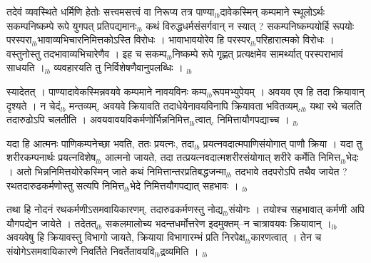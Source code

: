 \documentclass[article,12pt,a4paper]{memoir}%
\newcounter{parCount}
\begin{document}
	  \pstart \leavevmode%
	तदेवं व्यवस्थिते धर्मिणि हेतोः सत्त्वमसत्त्वं वा निरूप्य तत्र पाण्या{\tiny $_{lb}$}दावेकस्मिन् कम्पमाने स्थूलोऽर्थः सकम्पनिष्कम्पे रूपे युगपत् प्रतिपद्यमानः{\tiny $_{lb}$} कथं विरुद्धधर्मसंसर्गवान् न स्यात् ? सकम्पनिष्कम्पयोर्हि रूपयोः परस्परा{\tiny $_{lb}$}भावाव्यभिचारनिमित्तकोऽस्ति विरोधः । भावाभावयोरेव हि परस्पर{\tiny $_{lb}$}परिहारात्मको विरोधः । वस्तुनोस्तु तदभावाव्यभिचारेणैव । इह च सकम्प{\tiny $_{lb}$}निष्कम्पे रूपे गृह्णत् प्रत्यक्षमेव सामर्थ्यात् परस्पराभावं साधयति ।{\tiny $_{lb}$} व्यवहारयति तु निर्विशेषणैवानुपलब्धिः ।
	{}
	\pend%
      {\tiny $_{lb}$}

	  \pstart \leavevmode%
	स्यादेतत् । पाण्यादावेकस्मिन्नवयवे कम्पमाने नावयविनः कम्प{\tiny $_{lb}$}\leavevmode{}रूपमभ्युपेयम् । अवयव एव हि तदा क्रियावान् दृश्यते । न चेदं{\tiny $_{lb}$} मन्तव्यम्, अवयवे क्रियावति तदाधेयेनावयविनापि क्रियावता भवितव्यम्,{\tiny $_{lb}$} यथा रथे चलति तदारुढोऽपि चलतीति । अवयवावयविकर्मणोर्भिन्ननिमित्त{\tiny $_{lb}$}त्वात्, निमित्तायौगपद्याच्च ।
	{}
	\pend%
      {\tiny $_{lb}$}

	  \pstart \leavevmode%
	यदा हि आत्मनः पाणिकम्पनेच्छा भवति, ततः प्रयत्नः, तदा{\tiny $_{lb}$} प्रयत्नवदात्मपाणिसंयोगात् पाणौ क्रिया । यदा तु शरीरकम्पनार्थः प्रयत्नविशेष{\tiny $_{lb}$} आत्मनो जायते, तदा तत्प्रयत्नवदात्मशरीरसंयोगात् शरीरे कर्मेति निमित्त{\tiny $_{lb}$}भेदः । अतो भिन्ननिमित्तयोरेकस्मिन् जाते कथं निमित्तान्तरप्रतिबद्धजन्मा{\tiny $_{lb}$} तदभावे तदपरोऽपि तथैव जायेत ? रथतदारुढकर्मणोस्तु सत्यपि निमित्त{\tiny $_{lb}$}भेदे निमित्तयौगपद्यात् सहभावः ।
	{}
	\pend%
      {\tiny $_{lb}$}

	  \pstart \leavevmode%
	तथा हि नोदनं रथकर्मणीऽसमवायिकारणम्, तदारुढकर्मणस्तु नोद्य{\tiny $_{lb}$}संयोगः । तयोश्च सहभावात् कर्मणी अपि यौगपद्येन जायेते । तदेतत्{\tiny $_{lb}$} \leavevmode{} सकलमालोच्य भदन्तधर्मोत्तरेण इदमुक्तम्--न चात्रावयवः क्रियावान् ।{\tiny $_{lb}$} अवयवेषु हि क्रियावस्तु विभागो जायते, क्रियाया विभागारम्भं प्रति निरपेक्ष{\tiny $_{lb}$}कारणत्वात् । तेन च संयोगेऽसमवायिकारणे निवर्तिते निवर्तेतावयवि{\tiny $_{lb}$}द्रव्यमिति ।
	{}
	\pend%
      {\tiny $_{lb}$}
\end{document}
